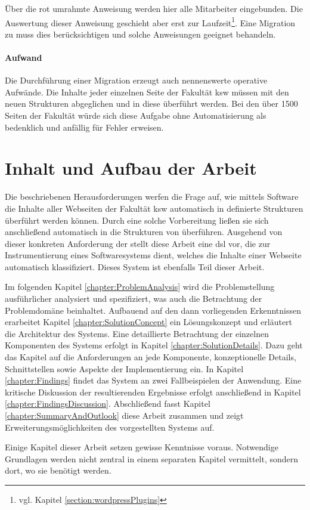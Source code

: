         Über die rot umrahmte Anweisung werden hier alle Mitarbeiter eingebunden.
        Die Auswertung dieser Anweisung geschieht aber erst zur
        Laufzeit\footnote{vgl. Kapitel \ref{section:wordpressPlugins}}.
        Eine Migration zu {\imperia} muss dies berücksichtigen und solche Anweisungen
        geeignet behandeln.

        \paragraph*{Aufwand}
        Die Durchführung einer Migration erzeugt auch nennenswerte operative Aufwände.
        Die Inhalte jeder einzelnen Seite der Fakultät \gls{ksw} müssen
        mit den neuen Strukturen abgeglichen und in diese überführt werden.
        Bei den über 1500 Seiten der Fakultät
        würde sich diese Aufgabe ohne Automatisierung als bedenklich und anfällig für Fehler erweisen.

    \section{Inhalt und Aufbau der Arbeit}
        Die beschriebenen Herausforderungen
        werfen die Frage auf, wie mittels Software die Inhalte aller Webseiten der Fakultät \gls{ksw}
        automatisch in definierte Strukturen überführt werden können.
        Durch eine solche Vorbereitung ließen sie sich anschließend
        automatisch in die Strukturen von {\imperia} überführen.
        Ausgehend von dieser konkreten Anforderung der {\fernUni} stellt diese Arbeit eine
        \gls{dsl} vor, die zur Instrumentierung eines Softwaresystems dient,
        welches die Inhalte einer Webseite automatisch klassifiziert.
        Dieses System ist ebenfalls Teil dieser Arbeit.

        Im folgenden Kapitel \ref{chapter:ProblemAnalysis} wird die Problemstellung ausführlicher
        analysiert und spezifiziert, was auch die Betrachtung der Problemdomäne beinhaltet.
        Aufbauend auf den dann vorliegenden Erkenntnissen erarbeitet
        Kapitel \ref{chapter:SolutionConcept}
        ein Lösungskonzept und erläutert die Architektur des Systems.
        Eine detaillierte Betrachtung der einzelnen Komponenten des Systems
        erfolgt in Kapitel \ref{chapter:SolutionDetails}.
        Dazu geht das Kapitel auf die Anforderungen an jede Komponente,
        konzeptionelle Details, Schnittstellen sowie Aspekte der Implementierung ein.       
        In Kapitel \ref{chapter:Findings} findet das System an zwei Fallbeispielen der {\fernUni}
        Anwendung.
        Eine kritische Diskussion der resultierenden Ergebnisse erfolgt anschließend in
        Kapitel \ref{chapter:FindingsDiscussion}.
        Abschließend fasst Kapitel \ref{chapter:SummaryAndOutlook}
        diese Arbeit zusammen und zeigt Erweiterungsmöglichkeiten
        des vorgestellten Systems auf.

        Einige Kapitel dieser Arbeit setzen gewisse Kenntnisse voraus.
        Notwendige Grundlagen werden nicht zentral in einem separaten Kapitel vermittelt,
        sondern dort, wo sie benötigt werden.
